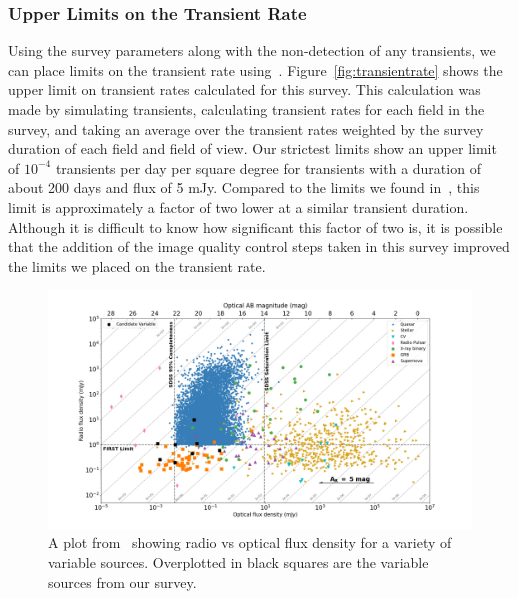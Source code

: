\documentclass[12pt]{article}
\begin{document}
\subsubsection{Upper Limits on the Transient Rate}
Using the survey parameters along with the non-detection of any transients, we can place limits on the transient rate using~\citet{2022ascl.soft04007C}. Figure~\ref{fig:transientrate} shows the upper limit on transient rates calculated for this survey. This calculation was made by simulating transients, calculating transient rates for each field in the survey, and taking an average over the transient rates weighted by the survey duration of each field and field of view. Our strictest limits show an upper limit of $10^{-4}$ transients per day per square degree for transients with a duration of about 200 days and flux of 5 mJy. Compared to the limits we found in~\citet{commensal1}, this limit is approximately a factor of two lower at a similar transient duration. Although it is difficult to know how significant this factor of two is, it is possible that the addition of the image quality control steps taken in this survey improved the limits we placed on the transient rate. 
\begin{figure}
	\includegraphics[width=\textwidth]{myradoptvars.png}
	\caption{A plot from~\citet{2018MNRAS.479.2481S} showing radio vs optical flux density for a variety of variable sources. Overplotted in black squares are the variable sources from our survey.}
	\label{fig:radoptplot}
\end{figure}
\end{document}
